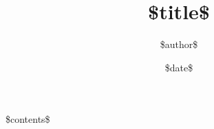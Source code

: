\documentclass{article}
\begin{document}
\title{\$title\$} 
\author{\$author\$}
\date{\$date\$}

\maketitle

\tableofcontents
\newpage

\$contents\$
\end{document}
